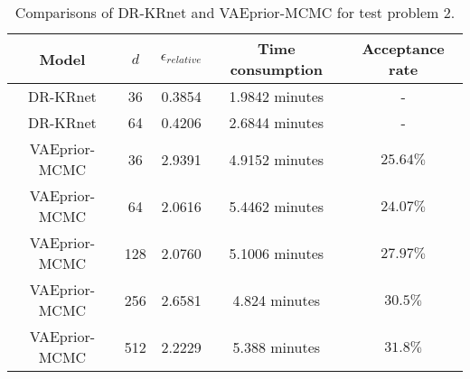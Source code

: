 \begin{table}
		\caption{Comparisons of DR-KRnet and VAEprior-MCMC for test problem 2.}
		\label{test22}
		\centering
		\begin{tabular}{ccccc}
			\toprule
			 Model&$d$ & $\epsilon_{relative}$ &Time consumption&Acceptance rate\\
			\midrule
			DR-KRnet &36 &0.3854&1.9842 minutes&-\\
			DR-KRnet & 64& 0.4206&2.6844 minutes &- \\
                \midrule
                VAEprior-MCMC &36 &2.9391&4.9152 minutes&$25.64\%$ \\
			VAEprior-MCMC &64& 2.0616&5.4462 minutes&$24.07\%$\\
                VAEprior-MCMC &128 &2.0760&5.1006 minutes&$27.97\%$\\
			VAEprior-MCMC &256& 2.6581&4.824 minutes& $30.5\%$ \\ 
                VAEprior-MCMC &512& 2.2229&5.388 minutes&$31.8\%$\\
                
   \bottomrule
		\end{tabular}
\end{table}
